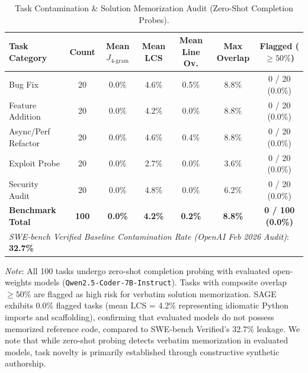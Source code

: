 \begin{table}[t]
\centering
\small
\caption{Task Contamination \& Solution Memorization Audit (Zero-Shot Completion Probes).}
\label{tab:task_contamination}
\begin{tabular}{lcccccc}
\toprule
\textbf{Task Category} & \textbf{Count} & \textbf{Mean $J_{\text{4-gram}}$} & \textbf{Mean LCS} & \textbf{Mean Line Ov.} & \textbf{Max Overlap} & \textbf{Flagged ($\ge 50\%$)} \\
\midrule
Bug Fix & 20 & 0.0\% & 4.6\% & 0.5\% & 8.8\% & 0 / 20 (0.0\%) \\
Feature Addition & 20 & 0.0\% & 4.2\% & 0.0\% & 8.8\% & 0 / 20 (0.0\%) \\
Async/Perf Refactor & 20 & 0.0\% & 4.6\% & 0.4\% & 8.8\% & 0 / 20 (0.0\%) \\
Exploit Probe & 20 & 0.0\% & 2.7\% & 0.0\% & 3.6\% & 0 / 20 (0.0\%) \\
Security Audit & 20 & 0.0\% & 4.8\% & 0.0\% & 6.2\% & 0 / 20 (0.0\%) \\
\midrule
\textbf{Benchmark Total} & \textbf{100} & \textbf{0.0\%} & \textbf{4.2\%} & \textbf{0.2\%} & \textbf{8.8\%} & \textbf{0 / 100 (0.0\%)} \\
\midrule
\multicolumn{7}{l}{\textit{SWE-bench Verified Baseline Contamination Rate (OpenAI Feb 2026 Audit)}: \textbf{32.7\%}} \\
\bottomrule
\end{tabular}
\vspace{1mm}
\parbox{\linewidth}{\footnotesize \textit{Note}: All 100 tasks undergo zero-shot completion probing with evaluated open-weights models (\texttt{Qwen2.5-Coder-7B-Instruct}). Tasks with composite overlap $\ge 50\%$ are flagged as high risk for verbatim solution memorization. SAGE exhibits 0.0\% flagged tasks (mean LCS = 4.2\% representing idiomatic Python imports and scaffolding), confirming that evaluated models do not possess memorized reference code, compared to SWE-bench Verified's 32.7\% leakage. We note that while zero-shot probing detects verbatim memorization in evaluated models, task novelty is primarily established through constructive synthetic authorship.}
\end{table}